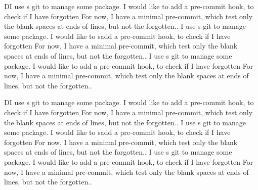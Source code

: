 \documentclass[a4paper, oneside, 12pt]{book}
\begin{document}
\setcounter{tocdepth}{25}
\tableofcontents

\newpage
\begin{pages}
\begin{Leftside}
\beginnumbering

\pstart
{}
\pend
\pstart
DI use s git to manage some package.
I would like to add a pre-commit hook, to check if I have forgotten
For now, I have a minimal pre-commit, which test only the blank spaces at ends of lines, but not the forgotten..
\pend
\pstart
{}
\pend
\pstart
{}
\pend
\pstart
{}
\pend
\pstart
{}I use s git to manage some package.
I would like to  {s}add a pre-commit hook, to check if I have forgotten
For now, I have a minimal pre-commit, which test only the blank spaces at ends of lines, but not the forgotten..
\pend
\pstart
{}
\pend
\pstart
{}I use s git to manage some package.
I would like to add a pre-commit hook, to check if I have forgotten
For now, I have a minimal pre-commit, which test only the blank spaces at ends of lines, but not the forgotten..
\pend


\endnumbering
\end{Leftside}

\begin{Rightside}
\beginnumbering

\pstart
{}
\pend
\pstart
DI use s git to manage some package.
I would like to add a pre-commit hook, to check if I have forgotten
For now, I have a minimal pre-commit, which test only the blank spaces at ends of lines, but not the forgotten..
\pend
\pstart
{}
\pend
\pstart
{}
\pend
\pstart
{}
\pend
\pstart
{}I use s git to manage some package.
I would like to  {s}add a pre-commit hook, to check if I have forgotten
For now, I have a minimal pre-commit, which test only the blank spaces at ends of lines, but not the forgotten..
\pend
\pstart
{}
\pend
\pstart
{}I use s git to manage some package.
I would like to add a pre-commit hook, to check if I have forgotten
For now, I have a minimal pre-commit, which test only the blank spaces at ends of lines, but not the forgotten..
\pend


\endnumbering

\end{Rightside}
\Pages
\end{pages}
\end{document}
